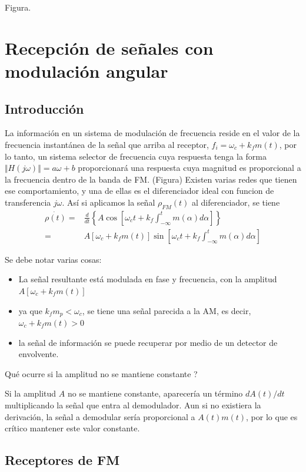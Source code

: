 \documentclass[12pt,letterpaper,titlepage,twoside]{book}
\begin{document}
 Figura.
 
\chapter{Recepción de señales con modulación angular}
\section{Introducción}
La información en un sistema de modulación de frecuencia reside en el valor de la frecuencia instantánea de la señal que arriba al receptor, $f_i = \omega_c + k_f m(t)$, por lo tanto, un sistema selector de frecuencia cuya respuesta tenga la forma $\Vert H(j\omega) \Vert = a \omega +b$ proporcionará una respuesta cuya magnitud es proporcional a la frecuencia dentro de la banda de FM. (Figura)	Existen varias redes que tienen ese comportamiento, y una de ellas es el diferenciador ideal con funcion de transferencia $j\omega$. Así si aplicamos la señal $\rho_{FM}(t)$ al diferenciador, se tiene
\begin{align}
\dot{\rho(t)} =& \frac{d}{dt}\left\lbrace A \cos \left[ \omega_c t + k_f \int_{-\infty}^t m(\alpha) d\alpha\right] \right\rbrace\\
=& A \left[ \omega_c + k_f m(t) \right] \sin \left[ \omega_c t + k_f \int_{-\infty}^t m(\alpha) d\alpha\right]
\end{align}

Se debe notar varias cosas:
\begin{itemize}
\item La señal resultante está modulada en fase y frecuencia, con la amplitud $A \left[ \omega_c + k_f m(t) \right]$
\item ya que $k_f m_p < \omega_c$, se tiene una señal parecida a la AM, es decir,  $\omega_c + k_f m(t)>0$ 
\item la señal de información se puede recuperar por medio de un detector de envolvente.

\end{itemize}
Qué ocurre si la amplitud no se mantiene constante ?

Si la amplitud $A$ no se mantiene constante, aparecería un término $dA(t) / dt$ multiplicando la señal que entra al demodulador. Aun si no existiera la derivación, la señal a demodular sería proporcional a $A(t) m(t)$, por lo que es crítico mantener este valor constante.


\section{Receptores de 	FM}
\end{document}
